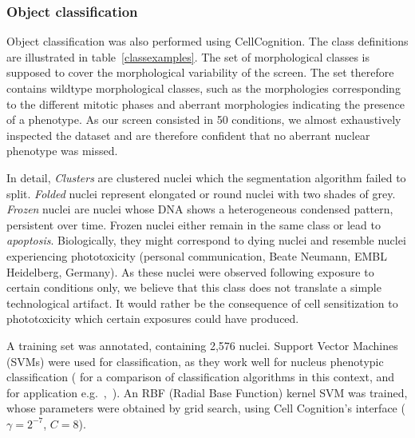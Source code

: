 \subsubsection{Object classification}
Object classification was also performed using CellCognition. The
class definitions are illustrated in table~\ref{classexamples}. The
set of morphological classes is supposed to cover the morphological
variability of the screen. The set therefore contains wildtype
morphological classes, such as the morphologies corresponding to the
different mitotic phases and aberrant morphologies indicating the
presence of a phenotype. As our screen consisted in 50 conditions, we
almost exhaustively inspected the dataset and are therefore confident
that no aberrant nuclear phenotype was missed. 


In detail, \textit{Clusters} are clustered nuclei which the
segmentation algorithm failed to split. \textit{Folded} nuclei
represent elongated or round nuclei with two shades of
grey. \textit{Frozen} nuclei are nuclei whose DNA shows a
heterogeneous condensed pattern, persistent over time. Frozen nuclei
either remain in the same class or lead to 
\textit{apoptosis}. Biologically, they might correspond to dying
nuclei and resemble nuclei experiencing phototoxicity (personal
communication, Beate Neumann, EMBL Heidelberg,
Germany). As these nuclei were observed following exposure to certain conditions only, we believe that this class does not translate a simple technological artifact. It would rather be the consequence of cell sensitization to phototoxicity which certain exposures could have produced. 


A training set was annotated, containing 2,576 nuclei. Support Vector Machines (SVMs) were used for classification, as they work well for nucleus phenotypic classification (\cite{kovalev} for a comparison of classification algorithms in this context, and for application e.g.~\cite{cellcognition},~\cite{Walter2010}). An RBF (Radial Base Function) kernel SVM was trained, whose parameters were obtained by grid search, using Cell Cognition's interface ($\gamma=2^{-7}$, $C=8$).%


